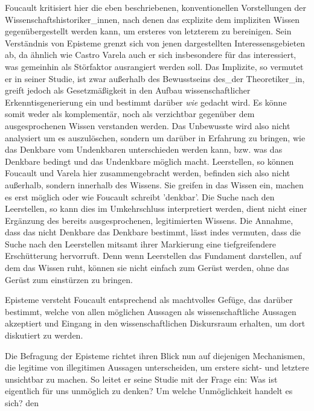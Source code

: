 Foucault kritisiert hier die eben beschriebenen, konventionellen Vorstellungen
der Wissenschaftshistoriker\_innen, nach denen das explizite dem impliziten
Wissen gegenübergestellt werden kann, um ersteres von letzterem zu bereinigen.
Sein Verständnis von Episteme grenzt sich von jenen dargestellten
Interessensgebieten ab, da ähnlich wie Castro Varela auch er sich insbesondere
für das interessiert, was gemeinhin als Störfaktor ausrangiert werden soll. Das
Implizite, so vermutet er in seiner Studie, ist zwar außerhalb des Bewusstseins
des\_der Theoretiker\_in, greift jedoch als Gesetzmäßigkeit in den Aufbau
wissenschaftlicher Erkenntisgenerierung ein und bestimmt darüber \textit{wie}
gedacht wird.\footnotemark {} 
Es könne somit weder als komplementär, noch als verzichtbar
gegenüber dem ausgesprochenen Wissen verstanden werden.\footnotemark
{} 
 Das Unbewusste wird
also nicht analysiert um es auszulöschen, sondern um darüber in Erfahrung zu
bringen, wie das Denkbare vom Undenkbaren unterschieden werden kann, bzw. was
das Denkbare bedingt und das Undenkbare möglich macht. Leerstellen, so können
Foucault und Varela hier zusammengebracht werden, befinden sich also nicht
außerhalb, sondern innerhalb des Wissens. Sie greifen in das Wissen ein, machen
es erst möglich oder wie Foucault schreibt 'denkbar'. Die Suche nach den
Leerstellen, so kann dies im Umkehrschluss interpretiert werden, dient nicht
einer Ergänzung des bereits ausgesprochenen, legitimierten Wissens. Die Annahme,
dass das nicht Denkbare das Denkbare bestimmt, lässt indes vermuten, dass die
Suche nach den Leerstellen mitsamt ihrer Markierung eine tiefgreifendere
Erschütterung hervorruft. Denn wenn Leerstellen das Fundament darstellen, auf
dem das Wissen ruht, können sie nicht einfach zum Gerüst werden, ohne das Gerüst
zum einstürzen zu bringen.

Episteme versteht Foucault entsprechend als machtvolles Gefüge, das darüber
bestimmt, welche von allen möglichen Aussagen als wissenschaftliche Aussagen
akzeptiert und Eingang in den wissenschaftlichen Diskursraum erhalten, um dort
diskutiert zu werden.\footnotemark {} 


Die Befragung der Episteme richtet ihren Blick nun auf diejenigen Mechanismen,
die legitime von illegitimen Aussagen unterscheiden, um erstere sicht- und
letztere unsichtbar zu machen. So leitet er seine Studie mit der Frage ein:
\glqq Was ist eigentlich für uns unmöglich zu denken? Um welche Unmöglichkeit
handelt es sich? \grqq \footnotemark {} den 

